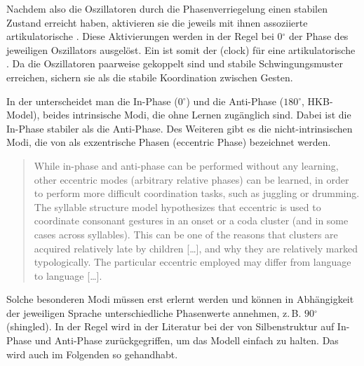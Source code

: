 Nachdem also die Oszillatoren durch die Phasenverriegelung einen stabilen Zustand erreicht haben, aktivieren sie die jeweils mit ihnen assoziierte artikulatorische . Diese Aktivierungen werden in der Regel bei  $0{}^{\circ}$ der Phase des jeweiligen Oszillators ausgelöst. Ein  ist somit der  (clock) für eine artikulatorische . Da die Oszillatoren paarweise gekoppelt sind und stabile Schwingungsmuster erreichen, sichern sie als  die stabile Koordination zwischen Gesten.

In der  unterscheidet man die In-Phase ($0{}^{\circ}$) und die Anti-Phase ($180{}^{\circ}$, HKB-Model), beides intrinsische Modi, die ohne Lernen zugänglich sind. Dabei ist die In-Phase stabiler als die Anti-Phase. Des Weiteren gibt es die nicht-intrinsischen Modi, die von \citet{Goldstein2010} als exzentrische Phasen (eccentric Phase) bezeichnet werden.

\begin{quote}
	While in-phase and anti-phase  can be performed without any learning, other eccentric  modes (arbitrary relative phases) can be learned, in order to perform more difficult coordination tasks, such as juggling or drumming. The syllable structure model hypothesizes that eccentric  is used to coordinate consonant gestures in an onset or a coda cluster (and in some cases across syllables). This can be one of the reasons that clusters are acquired relatively late by children [\dots], and why they are relatively marked typologically. The particular eccentric  employed may differ from language to language [\dots]. \citep[][5]{Goldstein2011}
\end{quote}

Solche besonderen Modi müssen erst erlernt werden und können in Abhängigkeit der jeweiligen Sprache unterschiedliche Phasenwerte annehmen, z.\,B. $90{}^{\circ}$ (shingled). In der Regel wird in der Literatur bei der  von Silbenstruktur auf In-Phase und Anti-Phase zurückgegriffen, um das Modell einfach zu halten. Das wird auch im Folgenden so gehandhabt. 


\begin{table}[htbp]
	\caption{Attraktoren für die Phasenverriegelung, adaptiert von \citet{Goldstein2010}; Form und Farbe der Pfeile zeigt die graphische Verwendung im Kopplungsgraph.}
	\label{table:0301}
\end{table}


